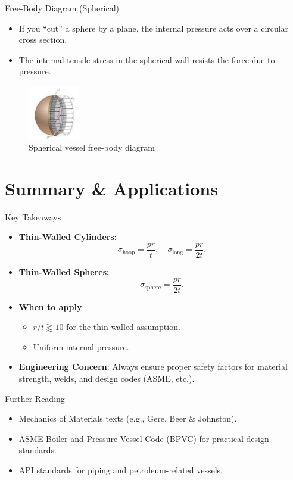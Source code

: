 \documentclass[aspectratio=169]{beamer}
\begin{document}
\begin{frame}{Free-Body Diagram (Spherical)}
  \begin{itemize}
    \item If you “cut” a sphere by a plane, the internal pressure acts over a circular cross section.
    \item The internal tensile stress in the spherical wall resists the force due to pressure.
  \end{itemize}
  \vfill
  \begin{figure}
    \centering
    \includegraphics[width=0.2\textwidth]{sphere.png} %
    \caption{Spherical vessel free-body diagram}
  \end{figure}
\end{frame}

\section{Summary \& Applications}

\begin{frame}{Key Takeaways}
  \begin{itemize}
    \item \textbf{Thin-Walled Cylinders:}
      \[
        \sigma_{\text{hoop}} = \frac{p r}{t}, 
        \quad
        \sigma_{\text{long}} = \frac{p r}{2t}.
      \]
    \item \textbf{Thin-Walled Spheres:}
      \[
        \sigma_{\text{sphere}} = \frac{p r}{2t}.
      \]
    \item \textbf{When to apply}:
      \begin{itemize}
        \item $r / t \gtrapprox 10$ for the thin-walled assumption.
        \item Uniform internal pressure.
      \end{itemize}
    \item \textbf{Engineering Concern}: Always ensure proper safety factors for material strength, welds, and design codes (ASME, etc.).
  \end{itemize}
\end{frame}

\begin{frame}{Further Reading}
  \begin{itemize}
    \item Mechanics of Materials texts (e.g., Gere, Beer \& Johnston).
    \item ASME Boiler and Pressure Vessel Code (BPVC) for practical design standards.
    \item API standards for piping and petroleum-related vessels.
  \end{itemize}
  \vfill
  \centering
\end{frame}
\end{document}
